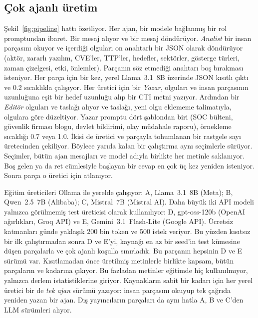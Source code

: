\documentclass[journal]{IEEEtran}
\begin{document}
\subsection{Çok ajanlı üretim}

Şekil~\ref{fig:pipeline} hattı özetliyor. Her ajan, bir modele bağlanmış bir rol promptundan ibaret. Bir mesaj alıyor
ve bir mesaj döndürüyor. \emph{Analist} bir insan parçasını okuyor ve içerdiği olguları on anahtarlı bir JSON olarak
döndürüyor (aktör, zararlı yazılım, CVE'ler, TTP'ler, hedefler, sektörler, gösterge türleri, zaman çizelgesi, etki,
önlemler). Parçanın söz etmediği anahtarı boş bırakması isteniyor. Her parça için bir kez, yerel Llama~3.1~8B
üzerinde JSON kısıtlı çıktı ve 0.2 sıcaklıkla çalışıyor. Her üretici için bir \emph{Yazar}, olguları ve insan
parçasının uzunluğuna eşit bir hedef uzunluğu alıp bir CTI metni yazıyor. Ardından bir \emph{Editör} olguları ve
taslağı alıyor ve taslağı, yeni olgu eklememe talimatıyla, olgulara göre düzeltiyor. Yazar promptu dört şablondan
biri (SOC bülteni, güvenlik firması blogu, devlet bildirimi, olay müdahale raporu), örnekleme sıcaklığı 0.7 veya
1.0. İkisi de üretici ve parçayla tohumlanan bir rastgele sayı üretecinden çekiliyor. Böylece yarıda kalan bir
çalıştırma aynı seçimlerle sürüyor. Seçimler, bütün ajan mesajları ve model adıyla birlikte her metinle
saklanıyor. Boş gelen ya da ret cümlesiyle başlayan bir cevap en çok üç kez yeniden isteniyor. Sonra parça o
üretici için atlanıyor.

Eğitim üreticileri Ollama ile yerelde çalışıyor: A, Llama~3.1~8B (Meta); B, Qwen~2.5~7B (Alibaba); C, Mistral~7B
(Mistral AI). Daha büyük iki API modeli yalnızca görülmemiş test üreticisi olarak kullanılıyor: D, gpt-oss-120b
(OpenAI ağırlıkları, Groq API) ve E, Gemini~3.1~Flash-Lite (Google API). Ücretsiz katmanları günde yaklaşık 200 bin
token ve 500 istek veriyor. Bu yüzden kısıtsız bir ilk çalıştırmadan sonra D ve E'yi, kaynağı en az bir seed'in
test kümesine düşen parçalarla ve çok ajanlı koşulla sınırladık. Bu \NVarChunks{} parçanın hepsinin D ve E sürümü
var. Kısıtlamadan önce üretilmiş metinlerle birlikte kapsam, bütün parçaların \NCoverD{} ve \NCoverE{} kadarına
çıkıyor. Bu fazladan metinler eğitimde hiç kullanılmıyor, yalnızca derlem istatistiklerine giriyor. Kaynakların
sabit bir \SingleShare{} kadarı için her yerel üretici bir de \emph{tek ajan} sürümü yazıyor: insan parçasını okuyup
tek çağrıda yeniden yazan bir ajan. Dış yayıncıların parçaları da aynı hatla A, B ve C'den LLM sürümleri alıyor.
\end{document}
